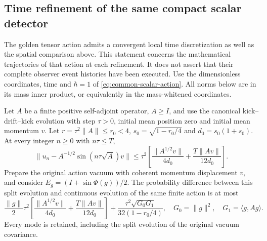\subsection{Time refinement of the same compact scalar detector}
\label{sec:source-scalar-time-refinement}

The golden tensor action admits a convergent local time discretization as
well as the spatial comparison above. This statement concerns the
mathematical trajectories of that action at each refinement. It does not
assert that their complete observer event histories have been executed.
Use the dimensionless coordinates, time and $\hbar=1$ of
\eqref{eq:common-scalar-action}. All norms below are in its mass inner
product, or equivalently in the mass-whitened coordinates.

\begin{proposition}
\label{prop:source-scalar-time-refinement}
Let $A$ be a finite positive self-adjoint operator, $A\ge I$, and use the
canonical kick--drift--kick evolution with step $\tau>0$, initial mean
position zero and initial mean momentum $v$. Let
$r=\tau^2\|A\|\le r_0<4$, $s_0=\sqrt{1-r_0/4}$ and
$d_0=s_0(1+s_0)$. At every integer $n\ge0$ with $n\tau\le T$,
\begin{equation}
 \|u_n-A^{-1/2}\sin(n\tau\sqrt A)v\|
 \le\tau^2\left[
 \frac{\|A^{1/2}v\|}{4d_0}+\frac{T\|Av\|}{12d_0}\right].
 \label{eq:source-scalar-time-displacement}
\end{equation}
Prepare the original action vacuum with coherent momentum displacement
$v$, and consider $E_g=(I+\sin\Phi(g))/2$. The probability difference
between this split evolution and continuous evolution of the same finite
action is at most
\begin{equation}
 \frac{\|g\|}{2}\tau^2\left[
 \frac{\|A^{1/2}v\|}{4d_0}+\frac{T\|Av\|}{12d_0}\right]
 +\frac{\tau^2\sqrt{G_0G_1}}{32(1-r_0/4)},
 \quad G_0=\|g\|^2,\quad G_1=\langle g,Ag\rangle.
 \label{eq:source-scalar-time-probability}
\end{equation}
Every mode is retained, including the split evolution of the original
vacuum covariance.
\end{proposition}
